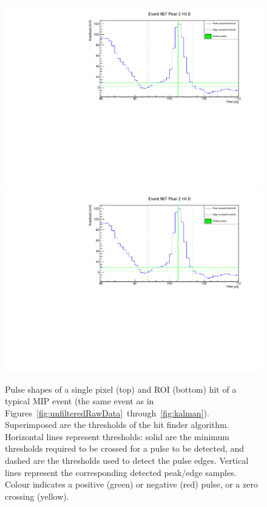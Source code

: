 \documentclass[a4paper]{article}
\begin{document}
\begin{figure}[htb]
	\centering
	\includegraphics[width=\textwidth, page=1]{event967_pixel2_hit8}\\
	\includegraphics[width=\textwidth, page=3]{event967_pixel2_hit8}
	\caption{Pulse shapes of a single pixel (top) and ROI (bottom) hit of a typical MIP event (the same event as in Figures~\ref{fig:unfilteredRawData}~through~\ref{fig:kalman}).
		Superimposed are the thresholds of the hit finder algorithm. Horizontal lines represent thresholds: solid are the minimum thresholds required to be crossed for a pulse to be detected, and dashed are the thresholds used to detect the pulse edges.
		Vertical lines represent the corresponding detected peak/edge samples.
		Colour indicates a positive (green) or negative (red) pulse, or a zero crossing (yellow).}
	\label{fig:hitFinder}
\end{figure}
\end{document}
